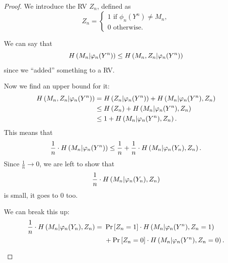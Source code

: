 \begin{proof}
	We introduce the \ac{RV} $Z_n$, defined as
	\begin{equation*}
		Z_n =
			\begin{cases}
				1 \text{ if } \phi_n(Y^n) \neq M_n,\\
				0 \text{ otherwise.}
			\end{cases} 
	\end{equation*}

	We can say that
	\begin{equation*}
		H\left({M_n | \varphi_n(Y^n)}\right) \le
		H\left({M_n, Z_n | \varphi_n(Y^n)}\right)
	\end{equation*}
	since we ``added'' something to a \ac{RV}.

	Now we find an upper bound for it:
	\begin{align*}
		H\left({M_n, Z_n | \varphi_n(Y^n)}\right)
		& =
		H\left({Z_n | \varphi_n(Y^n)}\right) +
		H\left({M_n | \varphi_n(Y^n), Z_n}\right)
		\\
		& \le
		H\left({Z_n}\right) +
		H\left({M_n | \varphi_n(Y^n), Z_n}\right)
		\\
		& \le
		1 +
		H\left({M_n | \varphi_n(Y^n), Z_n}\right).
	\end{align*}
	This means that
	\begin{equation*}
		\frac{1}{n} \cdot H\left({M_n | \varphi_n(Y^n)}\right) \le
		\frac{1}{n} + \frac{1}{n} \cdot H\left({M_n | \varphi_n(Y_n), Z_n}\right).
	\end{equation*}
	Since $\frac{1}{n} \to 0$, we are left to show that
	\begin{equation*}
		\frac{1}{n} \cdot H\left({M_n | \varphi_n(Y_n), Z_n}\right)
	\end{equation*}
	is small, \ie it goes to $0$ too.

	We can break this up:
	\begin{equation} \label{eq:eqbreak}
	\begin{aligned}
		\frac{1}{n} \cdot H\left({M_n | \varphi_n(Y_n), Z_n}\right)
		= &~
		\mathop{\mathrm{Pr}}\limits_{} \left[ {Z_n = 1} \right] \cdot H\left({M_n | \varphi_n(Y^n), Z_n = 1}\right)
		\\
		&~+
		\mathop{\mathrm{Pr}}\limits_{} \left[ {Z_n = 0} \right] \cdot H\left({M_n | \varphi_n(Y^n), Z_n = 0}\right).  
	\end{aligned}
	\end{equation}


\end{proof}
